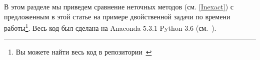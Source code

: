 \documentclass[12pt]{article}
\begin{document}
В этом разделе мы приведем сравнение неточных методов (см. \ref{Inexact}) с предложенным в этой статье на примере двойственной задачи по времени работы\footnote{Вы можете найти весь код в репозитории~\cite{my_git}}. Весь код был сделана на Anaconda 5.3.1 Python 3.6 (см.~\cite{conda}).

\begin{figure}[ht!]  
\vspace{-4ex} \centering {}  
\hspace{2ex}
\vspace{2ex}
\hspace{2ex}
\vspace{2ex}

\end{figure}
\end{document}
